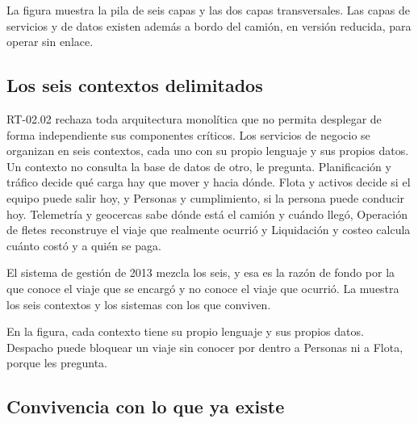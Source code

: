 
La figura muestra la pila de seis capas y las dos capas transversales. Las capas de servicios y de
datos existen además a bordo del camión, en versión reducida, para operar sin enlace.


\subsection{Los seis contextos delimitados}\label{sec:4-contextos}

RT-02.02 rechaza toda arquitectura monolítica que no permita desplegar de forma independiente sus
componentes críticos. Los servicios de negocio se organizan en seis contextos, cada uno con su propio
lenguaje y sus propios datos. Un contexto no consulta la base de datos de otro, le pregunta. Planificación y tráfico decide qué carga hay que mover y hacia dónde.
Flota y activos decide si el equipo puede salir hoy, y Personas y cumplimiento, si la persona puede
conducir hoy. Telemetría y geocercas sabe dónde está el camión y cuándo llegó, Operación de fletes
reconstruye el viaje que realmente ocurrió y Liquidación y costeo calcula cuánto costó y a quién se
paga.

El sistema de gestión de 2013 mezcla los seis, y esa es la razón de fondo por la que conoce el viaje
que se encargó y no conoce el viaje que ocurrió. La  muestra los seis contextos
y los sistemas con los que conviven.


En la figura, cada contexto tiene su propio lenguaje y sus propios datos. Despacho puede bloquear un
viaje sin conocer por dentro a Personas ni a Flota, porque les pregunta.

\subsection{Convivencia con lo que ya existe}\label{sec:4-convivencia}

